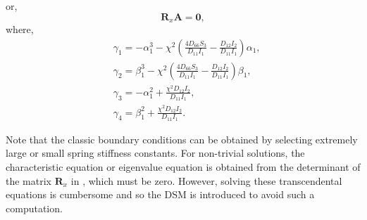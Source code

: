 \documentclass[preprint,12pt,number]{elsarticle}
\begin{document}
%
or,
%
\begin{equation}\label{eq:ABx1}
\mathbf{R}_x \mathbf{A} = \mathbf{0},
\end{equation}
%
where,
%
\begin{equation}\label{eq:gamma}
\begin{split}
	&\gamma_1 = -\alpha_1^3 - \chi^2 \left( \frac{4D_{66}S_3}{D_{11}I_1} - \frac{D_{12}I_2}{D_{11}I_1} \right) \alpha_1, \\
	&\gamma_2 = \beta_1^3 - \chi^2 \left( \frac{4D_{66}S_3}{D_{11}I_1} - \frac{D_{12}I_2}{D_{11}I_1} \right) \beta_1, \\
	&\gamma_3 = -\alpha_1^2 + \frac{\chi^2 D_{12} I_2}{D_{11} I_1}, \\
	&\gamma_4 = \beta_1^2 + \frac{\chi^2 D_{12} I_2}{D_{11} I_1}.
\end{split}
\end{equation}

Note that the classic boundary conditions can be obtained by selecting extremely large or small spring stiffness constants.
For non-trivial solutions, the characteristic equation or eigenvalue equation is obtained from the determinant of the matrix $\mathbf{R}_x$ in , which must be zero.
However, solving these transcendental equations is cumbersome and so the DSM is introduced to avoid such a computation.
\end{document}
